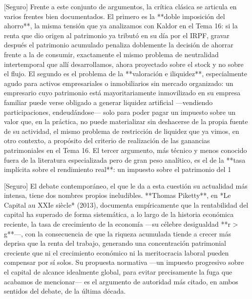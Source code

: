 \documentclass[10pt,a4paper]{article}
\begin{document}
[Seguro] Frente a este conjunto de argumentos, la crítica clásica se articula en varios frentes bien documentados. El primero es la **doble imposición del ahorro**, la misma tensión que ya analizamos con Kaldor en el Tema 16: si la renta que dio origen al patrimonio ya tributó en su día por el IRPF, gravar después el patrimonio acumulado penaliza doblemente la decisión de ahorrar frente a la de consumir, exactamente el mismo problema de neutralidad intertemporal que allí desarrollamos, ahora proyectado sobre el stock y no sobre el flujo. El segundo es el problema de la **valoración e iliquidez**, especialmente agudo para activos empresariales o inmobiliarios sin mercado organizado: un empresario cuyo patrimonio está mayoritariamente inmovilizado en su empresa familiar puede verse obligado a generar liquidez artificial —vendiendo participaciones, endeudándose— solo para poder pagar un impuesto sobre un valor que, en la práctica, no puede materializar sin deshacerse de la propia fuente de su actividad, el mismo problema de restricción de liquidez que ya vimos, en otro contexto, a propósito del criterio de realización de las ganancias patrimoniales en el Tema 16. El tercer argumento, más técnico y menos conocido fuera de la literatura especializada pero de gran peso analítico, es el de la **tasa implícita sobre el rendimiento real**: un impuesto sobre el patrimonio del 1%

[Seguro] El debate contemporáneo, el que le da a esta cuestión su actualidad más intensa, tiene dos nombres propios ineludibles. **Thomas Piketty**, en *Le Capital au XXIe siècle* (2013), documenta empíricamente que la rentabilidad del capital ha superado de forma sistemática, a lo largo de la historia económica reciente, la tasa de crecimiento de la economía —su célebre desigualdad **r > g**—, con la consecuencia de que la riqueza acumulada tiende a crecer más deprisa que la renta del trabajo, generando una concentración patrimonial creciente que ni el crecimiento económico ni la meritocracia laboral pueden compensar por sí solos. Su propuesta normativa —un impuesto progresivo sobre el capital de alcance idealmente global, para evitar precisamente la fuga que acabamos de mencionar— es el argumento de autoridad más citado, en ambos sentidos del debate, de la última década.
\end{document}
